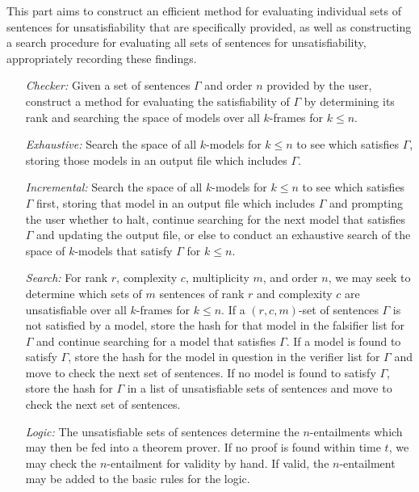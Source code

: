 \documentclass[a4paper, 11pt]{article} %
\begin{document}
This part aims to construct an efficient method for evaluating individual sets of sentences for unsatisfiability that are specifically provided, as well as constructing a search procedure for evaluating all sets of sentences for unsatisfiability, appropriately recording these findings.

\begin{enumerate}
  \item[\it Checker:] Given a set of sentences $\Gamma$ and order $n$ provided by the user, construct a method for evaluating the satisfiability of $\Gamma$ by determining its rank and searching the space of models over all $k$-frames for $k\leq n$.
  \item[\it Exhaustive:] Search the space of all $k$-models for $k\leq n$ to see which satisfies $\Gamma$, storing those models in an output file which includes $\Gamma$. 
  \item[\it Incremental:] Search the space of all $k$-models for $k\leq n$ to see which satisfies $\Gamma$ first, storing that model in an output file which includes $\Gamma$ and prompting the user whether to halt, continue searching for the next model that satisfies $\Gamma$ and updating the output file, or else to conduct an exhaustive search of the space of $k$-models that satisfy $\Gamma$ for $k\leq n$.
  \item[\it Search:] For rank $r$, complexity $c$, multiplicity $m$, and order $n$, we may seek to determine which sets of $m$ sentences of rank $r$ and complexity $c$ are unsatisfiable over all $k$-frames for $k\leq n$. If a $(r,c,m)$-set of sentences $\Gamma$ is not satisfied by a model, store the hash for that model in the falsifier list for $\Gamma$ and continue searching for a model that satisfies $\Gamma$. If a model is found to satisfy $\Gamma$, store the hash for the model in question in the verifier list for $\Gamma$ and move to check the next set of sentences. If no model is found to satisfy $\Gamma$, store the hash for $\Gamma$ in a list of unsatisfiable sets of sentences and move to check the next set of sentences. 
  \item[\it Logic:] The unsatisfiable sets of sentences determine the $n$-entailments which may then be fed into a theorem prover. If no proof is found within time $t$, we may check the $n$-entailment for validity by hand. If valid, the $n$-entailment may be added to the basic rules for the logic.
\end{enumerate}
\end{document}
